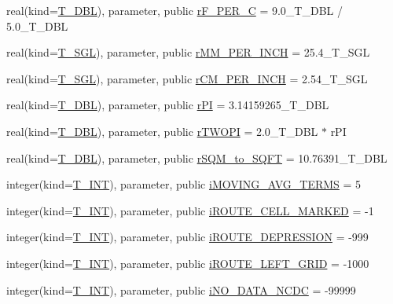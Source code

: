 \begin{DoxyCompactItemize}
\item 
real(kind=\hyperlink{namespacetypes_a888737411068474a167b1c3e5b579c58}{T\_\-DBL}), parameter, public \hyperlink{namespacetypes_a663b1a3284266c4c5cdbcfb63753f352}{rF\_\-PER\_\-C} = 9.0\_\-T\_\-DBL / 5.0\_\-T\_\-DBL
\item 
real(kind=\hyperlink{namespacetypes_af3012489af4c138f271f1bce244b7e51}{T\_\-SGL}), parameter, public \hyperlink{namespacetypes_ae91353f2b870e14fa790e351b8b3f865}{rMM\_\-PER\_\-INCH} = 25.4\_\-T\_\-SGL
\item 
real(kind=\hyperlink{namespacetypes_af3012489af4c138f271f1bce244b7e51}{T\_\-SGL}), parameter, public \hyperlink{namespacetypes_ab949fb6f49c2e3dfb6fa084310d81edf}{rCM\_\-PER\_\-INCH} = 2.54\_\-T\_\-SGL
\item 
real(kind=\hyperlink{namespacetypes_a888737411068474a167b1c3e5b579c58}{T\_\-DBL}), parameter, public \hyperlink{namespacetypes_a1f9e52478e9651360f7bd82fa744caa3}{rPI} = 3.14159265\_\-T\_\-DBL
\item 
real(kind=\hyperlink{namespacetypes_a888737411068474a167b1c3e5b579c58}{T\_\-DBL}), parameter, public \hyperlink{namespacetypes_ae0e7691ed560223af53b3ff28efafc11}{rTWOPI} = 2.0\_\-T\_\-DBL $\ast$ rPI
\item 
real(kind=\hyperlink{namespacetypes_a888737411068474a167b1c3e5b579c58}{T\_\-DBL}), parameter, public \hyperlink{namespacetypes_a2f2f871f373ad3176f43993fc23103a5}{rSQM\_\-to\_\-SQFT} = 10.76391\_\-T\_\-DBL
\item 
integer(kind=\hyperlink{namespacetypes_a4e4d040a4425196c4d43be63e7e6103a}{T\_\-INT}), parameter, public \hyperlink{namespacetypes_abe11dbc06cabd68c258ab0fff0c89d26}{iMOVING\_\-AVG\_\-TERMS} = 5
\item 
integer(kind=\hyperlink{namespacetypes_a4e4d040a4425196c4d43be63e7e6103a}{T\_\-INT}), parameter, public \hyperlink{namespacetypes_a42e13c9e6b0154abfab9212d6d7e6484}{iROUTE\_\-CELL\_\-MARKED} = -\/1
\item 
integer(kind=\hyperlink{namespacetypes_a4e4d040a4425196c4d43be63e7e6103a}{T\_\-INT}), parameter, public \hyperlink{namespacetypes_af9ac3dcedd1cd95154ef3208d656a7cc}{iROUTE\_\-DEPRESSION} = -\/999
\item 
integer(kind=\hyperlink{namespacetypes_a4e4d040a4425196c4d43be63e7e6103a}{T\_\-INT}), parameter, public \hyperlink{namespacetypes_ae4af15bc0a450716e8e45f1d550e1401}{iROUTE\_\-LEFT\_\-GRID} = -\/1000
\item 
integer(kind=\hyperlink{namespacetypes_a4e4d040a4425196c4d43be63e7e6103a}{T\_\-INT}), parameter, public \hyperlink{namespacetypes_ad9741d8d6e8a33ba13e4b3f00c94d5fa}{iNO\_\-DATA\_\-NCDC} = -\/99999

\end{DoxyCompactItemize}
